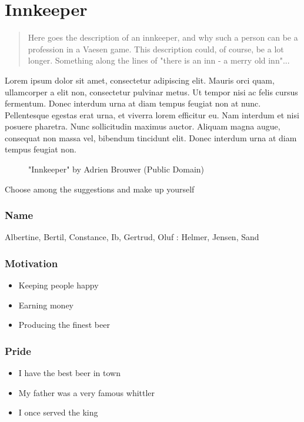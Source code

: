 \documentclass[english]{vaesen-supplement}
\begin{document}
\cleardoublepage

\section[Example Archetype]{\HUGE Innkeeper}

\begin{quote}\handwritten
    Here goes the description of an innkeeper, and why such a person can be a profession in a Vaesen game. This description could, of course, be a lot longer. Something along the lines of "there is an inn - a merry old inn"...   
\end{quote}
Lorem ipsum dolor sit amet, consectetur adipiscing elit. Mauris orci quam, ullamcorper a elit non, consectetur pulvinar metus. Ut tempor nisi ac felis cursus fermentum. Donec interdum urna at diam tempus feugiat non at nunc. Pellentesque egestas erat urna, et viverra lorem efficitur eu. Nam interdum et nisi posuere pharetra. Nunc sollicitudin maximus auctor. Aliquam magna augue, consequat non massa vel, bibendum tincidunt elit. Donec interdum urna at diam tempus feugiat non.

\begin{figure}[!b]
    \centering
    {\footnotesize "Innkeeper" by Adrien Brouwer (Public Domain)}
\end{figure}

\newpage

Choose among the suggestions and make up yourself

\subsubsection{Name}
\begin{itemize}
     Albertine, Bertil, Constance, Ib, Gertrud, Oluf 
    : Helmer, Jensen, Sand 
\end{itemize}
\subsubsection{Motivation}
\begin{itemize}
    \item Keeping people happy
    \item Earning money 
    \item Producing the finest beer
\end{itemize}
\subsubsection{Pride}
\begin{itemize}
    \item I have the best beer in town
    \item My father was a very famous whittler
    \item I once served the king
\end{itemize}
\end{document}
